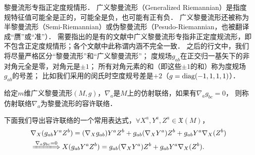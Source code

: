 黎曼流形专指正定度规情形．
广义黎曼流形（Generalized Riemannian）是指度规特征值可能全是正的，可能全是负，也可能有正有负．
广义黎曼流形还被称为半黎曼流形（Semi-Riemannian）或伪黎曼流形（Pesudo-Riemannian，也被翻译成“赝”或“准”）．
需要指出的是有的文献中广义黎曼流形专指非正定度规流形，即不包含正定度规情形；各个文献中此称谓内涵不完全一致．
之后的行文中，我们将尽量严格区分“黎曼流形”和“广义黎曼流形”；
度规场$g_{ab}$在正交归一基矢下的非对角元全是零，对角元是$\pm 1$；
所有对角元素的和（即这些$\pm 1$的和）称为度规场$g_{ab}$的{\heiti 号差}；
比如我们采用的闵氏时空度规号差是$+2$（$g={\rm diag}(-1,1,1,1)$）．

\begin{definition}
    给定$m$维广义黎曼流形$(M,g)$，$\nabla_a$是$M$上的仿射联络，如果有$\nabla_a g_{bc}=0$，
    则称仿射联络$\nabla_a$为黎曼流形的{\heiti 容许联络}．
\end{definition}
下面我们导出容许联络的一个常用表达式，$\forall X^a,Y^a,Z^a\in \mathfrak{X}(M)$，
\begin{align}
    &\nabla_{X}(g_{ab}Y^a Z^b)= (\nabla_{X}g_{ab})Y^a Z^b  +g_{ab}( \nabla_{X}Y^a) Z^b
      +g_{ab}Y^a\nabla_{X}( Z^b)  \notag \\
    &\xLongrightarrow{\nabla_a g_{bc}=0}
    {X}(g_{ab}Y^a Z^b)= g_{ab}( \nabla_{X}Y^a) Z^b
    +g_{ab}Y^a\nabla_{X}( Z^b).  \label{chgd:eqn_connection-compatibility}
\end{align}


